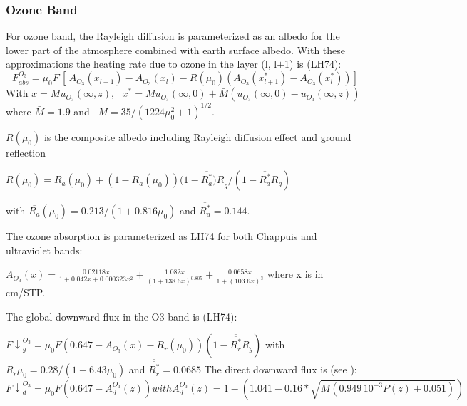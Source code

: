 \subsubsection{Ozone Band}

For ozone band, the Rayleigh diffusion is parameterized as an albedo for the
lower part of the atmosphere combined with earth surface albedo. With these
approximations the heating rate due to ozone in the layer (l, l$+$1) is
(LH74):
\begin{equation}
F_{abs}^{O_{3}}=\mu_{0}F\, [\, A_{O_{3}}\left( x_{l+1} \right)-A_{O_{3}}\left( x_{l}
\right)-\bar{R}(\mu_{0})\left( A_{O_{3}}\left( x_{l+1}^{\ast }
\right)-A_{O_{3}}\left( x_{l}^{\ast } \right) \right)]
\end{equation}
With $x=Mu_{O_{3}}\left( \infty ,z \right),\, \, \, \, x^{\ast }=Mu_{O_{3}}\left(
\infty ,0 \right)+\bar{M}(u_{O_{3}}\left( \infty ,0 \right)-u_{O_{3}}\left( \infty
,z \right))$ \\
where $\bar{M}=1.9$ and $\, \, \, M=35/{(1224\mu
_{0}^{2}+1)}^{1/2}$.

$\bar{R}(\mu_{0})$ is the composite albedo including Rayleigh diffusion
effect and ground reflection

$\bar{R}\left( \mu_{0} \right)=\overline{R_{a}}\left( \mu_{0}
\right)+(1-\overline{R_{a}}\left( \mu_{0} \right))(1-\overline{R_{a}^{\ast
}}{)R}_{g}/(1-\overline{R_{a}^{\ast }}R_{g})$

with $\overline{R_{a}}\left( \mu_{0}
\right)=0.213/(1+0.816\mu_{0})$ and $\overline{R_{a}^{\ast }}=0.144$.

The ozone absorption is parameterized as LH74 for both Chappuis and
ultraviolet bands:

$A_{O_{3}}\left( x
\right)=\frac{0.02118x}{1+0.042x+0.000323x^{2}}+\frac{1.082x}{{(1+138.6x)}^{0.805}}+\frac{0.0658x}{1+{(103.6x)}^{3}}$
where x is in cm/STP.


The global downward flux in the O3 band is (LH74):

${F\downarrow}_{g}^{O_{3}}=\mu_{0}F(0.647-A_{O_{3}}\left( x
\right)-\overline{R_{r}}\left( \mu_{0} \right))(1-
\overline{\overline{R_{r}^{\ast }}}
R_{g})$
\newline
with $\overline{R_{r}} \mu_{0}=0.28/(1+6.43\mu_{0})$
\newline
and $\overline{\overline{R_{r}^{\ast }}}=0.0685$
\newline
\newline
The direct downward flux is (see \cite{Atwater:1978}):
\begin{equation}
{F\downarrow }_{d}^{O_{3}}=\mu_{0}F\left( 0.647-A_{d}^{O_{3}}\left( z \right)
\right)with
A_{d}^{O_{3}}\left( z \right)=1-(1.041-0.16\ast \sqrt {M\left( 0.949\,
{10}^{-3}P\left( z \right)+0.051 \right)} )
\end{equation}
